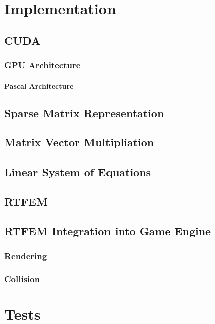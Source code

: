 \documentclass[en]{minipw} %
\begin{document}

\chapter{Implementation}

\section{CUDA}
\subsection{GPU Architecture}
\subsubsection{Pascal Architecture}

\section{Sparse Matrix Representation}

\section{Matrix Vector Multipliation}

\section{Linear System of Equations}

\section{RTFEM}

\section{RTFEM Integration into Game Engine}
\subsection{Rendering}
\subsection{Collision}


\chapter{Tests}
\end{document}
